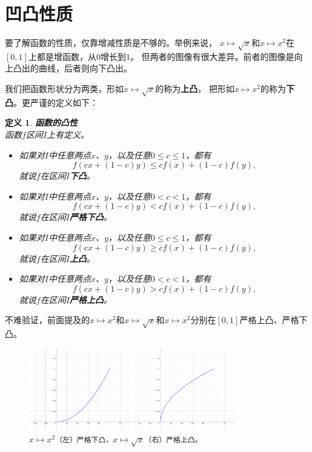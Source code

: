 \documentclass[12pt,UTF8]{ctexbook}
\newtheorem{df}{定义}[section]
\begin{document}
\section{凹凸性质}

要了解函数的性质，仅靠增减性质是不够的。举例来说，
$x\mapsto \sqrt{x}$和$x\mapsto x^2$在$[0,1]$上都是增函数，从$0$增长到$1$。
但两者的图像有很大差异。前者的图像是向上凸出的曲线，后者则向下凸出。

我们把函数形状分为两类，形如$x\mapsto \sqrt{x}$的称为\textbf{上凸}，
把形如$x\mapsto x^2$的称为\textbf{下凸}。更严谨的定义如下：

\begin{df}{\textbf{函数的凸性}}
    \mbox{} \\
    函数$f$区间$I$上有定义。
    \begin{itemize}
        \item 如果对$I$中任意两点$x$、$y$，以及任意$0 \leqslant c \leqslant 1$，都有
        $$ f(cx + (1 - c)y) \leqslant cf(x) + (1 - c)f(y), $$
        就说$f$在区间$I$\textbf{下凸}。
        \item 如果对$I$中任意两点$x$、$y$，以及任意$0 < c < 1$，都有
        $$ f(cx + (1 - c)y) < cf(x) + (1 - c)f(y), $$
        就说$f$在区间$I$\textbf{严格下凸}。
        \item 如果对$I$中任意两点$x$、$y$，以及任意$0 \leqslant c \leqslant 1$，都有
        $$ f(cx + (1 - c)y) \geqslant cf(x) + (1 - c)f(y), $$
        就说$f$在区间$I$\textbf{上凸}。
        \item 如果对$I$中任意两点$x$、$y$，以及任意$0 < c < 1$，都有
        $$ f(cx + (1 - c)y) > cf(x) + (1 - c)f(y), $$
        就说$f$在区间$I$\textbf{严格上凸}。
    \end{itemize}
\end{df}

不难验证，前面提及的$x\mapsto x^2$和$x\mapsto \sqrt{x}$和$x\mapsto x^2$分别在$[0,1]$严格上凸、严格下凸。

\begin{figure}[h]
    \centering
    \includegraphics[width=0.8\textwidth]{tu/凹凸函数1.png}
    \caption*{$x\mapsto x^2$\texttt{（左）严格下凸，}$x\mapsto \sqrt{x}$\texttt{（右）严格上凸。}}
\end{figure}
\end{document}
